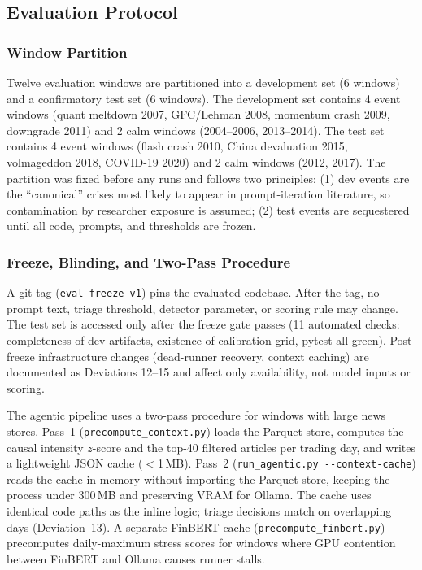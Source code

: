 \documentclass[11pt,a4paper]{article}
\begin{document}
\subsection{Evaluation Protocol}\label{sec:protocol}

\subsubsection{Window Partition}

Twelve evaluation windows are partitioned into a development set (6 windows)
and a confirmatory test set (6 windows). The development set contains 4 event
windows (quant meltdown 2007, GFC/Lehman 2008, momentum crash 2009,
downgrade 2011) and 2 calm windows (2004--2006, 2013--2014). The test set
contains 4 event windows (flash crash 2010, China devaluation 2015,
volmageddon 2018, COVID-19 2020) and 2 calm windows (2012, 2017). The
partition was fixed before any runs and follows two principles: (1) dev events
are the ``canonical'' crises most likely to appear in prompt-iteration
literature, so contamination by researcher exposure is assumed; (2) test events
are sequestered until all code, prompts, and thresholds are frozen.

\subsubsection{Freeze, Blinding, and Two-Pass Procedure}

A git tag (\texttt{eval-freeze-v1}) pins the evaluated codebase. After the
tag, no prompt text, triage threshold, detector parameter, or scoring rule may
change. The test set is accessed only after the freeze gate passes
(11 automated checks: completeness of dev artifacts, existence of calibration
grid, pytest all-green). Post-freeze infrastructure changes (dead-runner
recovery, context caching) are documented as Deviations 12--15 and affect only
availability, not model inputs or scoring.

The agentic pipeline uses a two-pass procedure for windows with large news
stores. Pass~1 (\texttt{precompute\_context.py}) loads the Parquet store,
computes the causal intensity $z$-score and the top-40 filtered articles per
trading day, and writes a lightweight JSON cache ($<$1\,MB). Pass~2
(\texttt{run\_agentic.py -{}-context-cache}) reads the cache in-memory without
importing the Parquet store, keeping the process under 300\,MB and preserving
VRAM for Ollama. The cache uses identical code paths as the inline logic;
triage decisions match on overlapping days (Deviation~13). A separate FinBERT
cache (\texttt{precompute\_finbert.py}) precomputes daily-maximum stress scores
for windows where GPU contention between FinBERT and Ollama causes runner
stalls.
\end{document}
